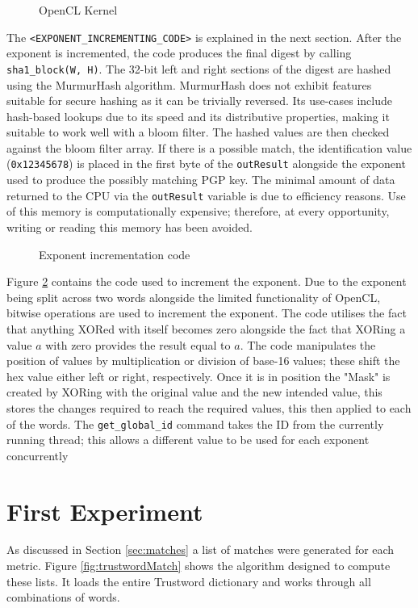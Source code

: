 \begin{figure}[!h]
  \centering
  
  \caption{OpenCL Kernel}
  \label{fig:opencl}
\end{figure}

The \verb|<EXPONENT_INCREMENTING_CODE>| is explained in the next section. After the exponent is incremented, the code produces the final digest by calling \verb|sha1_block(W, H)|. The 32-bit left and right sections of the digest are hashed using the MurmurHash algorithm. MurmurHash does not exhibit features suitable for secure hashing as it can be trivially reversed. Its use-cases include hash-based lookups due to its speed and its distributive properties, making it suitable to work well with a bloom filter. The hashed values are then checked against the bloom filter array. If there is a possible match, the identification value (\verb|0x12345678|) is placed in the first byte of the \verb|outResult| alongside the exponent used to produce the possibly matching PGP key. The minimal amount of data returned to the CPU via the \verb|outResult| variable is due to efficiency reasons. Use of this memory is computationally expensive; therefore, at every opportunity, writing or reading this memory has been avoided.

\begin{figure}[!h]
  \centering
  
  \caption{Exponent incrementation code}
  \label{fig:increment}
\end{figure}

Figure \ref{fig:increment} contains the code used to increment the exponent. Due to the exponent being split across two words alongside the limited functionality of OpenCL, bitwise operations are used to increment the exponent. The code utilises the fact that anything XORed with itself becomes zero alongside the fact that XORing a value $a$ with zero provides the result equal to $a$. The code manipulates the position of values by multiplication or division  of base-16 values; these shift the hex value either left or right, respectively. Once it is in position the "Mask" is created by XORing with the original value and the new intended value, this stores the changes required to reach the required values, this then applied to each of the words.
The \verb|get_global_id| command takes the ID from the currently running thread; this allows a different value to be used for each exponent concurrently

\newpage

\section{First Experiment}
\label{sec:exp1_implemtation}
As discussed in Section \ref{sec:matches} a list of matches were generated for each metric. Figure \ref{fig:trustwordMatch} shows the algorithm designed to compute these lists. It loads the entire Trustword dictionary and works through all combinations of words.

